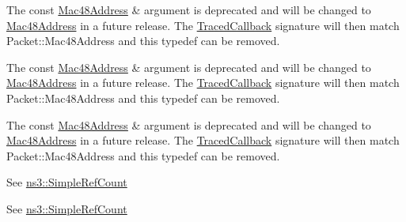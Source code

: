 \begin{DoxyRefList}
\item[\label{deprecated__deprecated000044}%
\hypertarget{deprecated__deprecated000044}{}%
Member \hyperlink{classns3_1_1WimaxNetDevice_a88710ac8dd5cdcee795372c5722be86e}{ns3\+:\+:Wimax\+Net\+Device\+:\+:m\+\_\+trace\+Rx} ]The {\ttfamily const \hyperlink{classns3_1_1Mac48Address}{Mac48\+Address} \&} argument is deprecated and will be changed to {\ttfamily \hyperlink{classns3_1_1Mac48Address}{Mac48\+Address}} in a future release. The \hyperlink{classns3_1_1TracedCallback}{Traced\+Callback} signature will then match {\ttfamily Packet\+::\+Mac48\+Address} and this typedef can be removed.  
\item[\label{deprecated__deprecated000045}%
\hypertarget{deprecated__deprecated000045}{}%
Member \hyperlink{classns3_1_1WimaxNetDevice_a8fcb2352790f8cc4b34adbb1a359fa97}{ns3\+:\+:Wimax\+Net\+Device\+:\+:m\+\_\+trace\+Tx} ]The {\ttfamily const \hyperlink{classns3_1_1Mac48Address}{Mac48\+Address} \&} argument is deprecated and will be changed to {\ttfamily \hyperlink{classns3_1_1Mac48Address}{Mac48\+Address}} in a future release. The \hyperlink{classns3_1_1TracedCallback}{Traced\+Callback} signature will then match {\ttfamily Packet\+::\+Mac48\+Address} and this typedef can be removed.  
\item[\label{deprecated__deprecated000043}%
\hypertarget{deprecated__deprecated000043}{}%
Member \hyperlink{classns3_1_1WimaxNetDevice_a535e69392034f55156a354580076bac5}{ns3\+:\+:Wimax\+Net\+Device\+:\+:Tx\+Rx\+Traced\+Callback} )(Ptr$<$ const Packet $>$ packet, const \hyperlink{classns3_1_1Mac48Address}{Mac48\+Address} \&mac)]The {\ttfamily const \hyperlink{classns3_1_1Mac48Address}{Mac48\+Address} \&} argument is deprecated and will be changed to {\ttfamily \hyperlink{classns3_1_1Mac48Address}{Mac48\+Address}} in a future release. The \hyperlink{classns3_1_1TracedCallback}{Traced\+Callback} signature will then match {\ttfamily Packet\+::\+Mac48\+Address} and this typedef can be removed.  
\item[\label{deprecated__deprecated000001}%
\hypertarget{deprecated__deprecated000001}{}%
File \hyperlink{ref-count-base_8cc}{ref-\/count-\/base.cc} ]See \hyperlink{classns3_1_1SimpleRefCount}{ns3\+::\+Simple\+Ref\+Count}  
\item[\label{deprecated__deprecated000002}%
\hypertarget{deprecated__deprecated000002}{}%
File \hyperlink{ref-count-base_8h}{ref-\/count-\/base.h} ]See \hyperlink{classns3_1_1SimpleRefCount}{ns3\+::\+Simple\+Ref\+Count} 
\end{DoxyRefList}